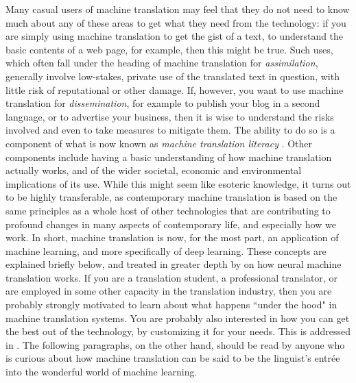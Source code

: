 \documentclass[output=paper]{langscibook}
\begin{document}
Many casual users of machine translation may feel that they do not need to know much about any of these areas to get what they need from the technology: if you are simply using machine translation to get the gist of a text, to understand the basic contents of a web page, for example, then this might be true. Such uses, which often fall under the heading of machine translation for \textit{assimilation}, generally involve low-stakes, private use of the translated text in question, with little risk of reputational or other damage. If, however, you want to use machine translation for \textit{dissemination}, for example to publish your blog in a second language, or to advertise your business, then it is wise to understand the risks involved and even to take measures to mitigate them. The ability to do so is a component of what is now known as \textit{machine translation literacy} \citep{BowkerCiro2019}. Other components include having a basic understanding of how machine translation actually works, and of the wider societal, economic and environmental implications of its use. While this might seem like esoteric knowledge, it turns out to be highly transferable, as contemporary machine translation is based on the same  principles as a whole host of other technologies that are contributing to profound changes in many aspects of contemporary life, and especially how we work. In short, machine translation is now, for the most part, an application of machine learning, and more specifically of deep learning. These concepts are explained briefly below, and treated in greater depth by  on how neural machine translation works. If you are a translation student, a professional translator, or are employed in some other capacity in the translation industry, then you are probably strongly motivated to learn about what happens “under the hood" in machine translation systems. You are probably also interested in how you can get the best out of the technology, by customizing it for your needs. This is addressed in . The following paragraphs, on the other hand, should be read by anyone who is curious about how machine translation can be said to be the linguist's entrée into the wonderful world of machine learning.
\end{document}

